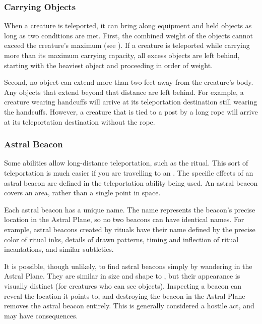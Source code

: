         \subsubsection{Carrying Objects}
            When a creature is teleported, it can bring along equipment and held objects as long as two conditions are met.
            First, the combined weight of the objects cannot exceed the creature's maximum  (see ).
            If a creature is teleported while carrying more than its maximum carrying capacity, all excess objects are left behind, starting with the heaviest object and proceeding in order of weight.

            Second, no object can extend more than two feet away from the creature's body.
            Any objects that extend beyond that distance are left behind.
            For example, a creature wearing handcuffs will arrive at its teleportation destination still wearing the handcuffs.
            However, a creature that is tied to a post by a long rope will arrive at its teleportation destination without the rope.

        \subsubsection{Astral Beacon}\label{Astral Beacon}
            Some abilities allow long-distance teleportation, such as the  ritual.
            This sort of teleportation is much easier if you are travelling to an .
            The specific effects of an astral beacon are defined in the teleportation ability being used.
            An astral beacon covers an area, rather than a single point in space.

            Each astral beacon has a unique name.
            The name represents the beacon's precise location in the Astral Plane, so no two beacons can have identical names.
            For example, astral beacons created by rituals have their name defined by the precise color of ritual inks, details of drawn patterns, timing and inflection of ritual incantations, and similar subtleties.

            It is possible, though unlikely, to find astral beacons simply by wandering in the Astral Plane.
            They are similar in size and shape to , but their appearance is visually distinct (for creatures who can see  objects).
            Inspecting a beacon can reveal the location it points to, and destroying the beacon in the Astral Plane removes the astral beacon entirely.
            This is generally considered a hostile act, and may have consequences.

